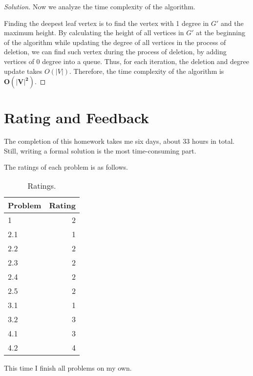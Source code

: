 \documentclass{article}
\newenvironment{solution}{\begin{proof}[\noindent\it Solution]}{\end{proof}}
\begin{document}
\begin{solution}
    \vspace{1em} \hspace{2.6em}
    Now we analyze the time complexity of the algorithm.
    
    \hspace{2.6em}
    Finding the deepest leaf vertex is to find the vertex with 1 degree in $G'$ and the maximum height. By calculating the height of all vertices in $G'$ at the beginning of the algorithm while updating the degree of all vertices in the process of deletion, we can find such vertex during the process of deletion, by adding vertices of 0 degree into a queue. Thus, for each iteration, the deletion and degree update takes $O(|V|)$. Therefore, the time complexity of the algorithm is \underline{$\boldsymbol{O(|V|^2)}$}.
\end{solution}

\vspace{3em}
\section{Rating and Feedback}
\vspace{1em} \hspace{1.2em}
The completion of this homework takes me six days, about $33$ hours in total. Still, writing a formal solution is the most time-consuming part.

The ratings of each problem is as follows.

\begin{table}[htbp]
    \centering
    \begin{tabular}{lr}
        \hline
        Problem & Rating \\
        \hline 
        1 & 2 \\
        \hline
        2.1 & 1 \\
        2.2 & 2 \\
        2.3 & 2 \\
        2.4 & 2 \\
        2.5 & 2 \\
        \hline
        3.1 & 1 \\
        3.2 & 3 \\
        \hline
        4.1 & 3 \\
        4.2 & 4 \\
        \hline
\end{tabular}
\caption{Ratings.}
\end{table}

This time I finish all problems on my own.
\end{document}
